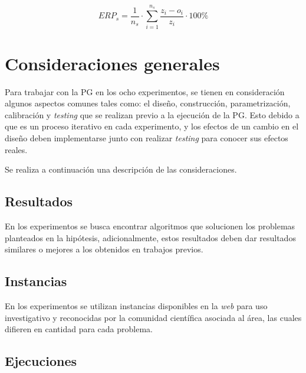 \begin{equation}
  \label{eq:ERP_cap3}
  ERP_{s} =  \frac{1}{n_{s}} \cdot \sum\limits_{i=1}^{n_{s}} \frac{z_{i} - o_{i}}{z_{i}} \cdot 100\%
\end{equation}


\section{Consideraciones generales}
\label{cap:consideraciones}

Para trabajar con la PG en los ocho experimentos, se tienen en consideración algunos aspectos comunes tales como: el diseño, construcción, parametrización, calibración y \textit{testing} que se realizan previo a la ejecución de la PG. Esto debido a que es un proceso iterativo en cada experimento, y los efectos de un cambio en el diseño deben implementarse junto con realizar \textit{testing} para conocer sus efectos reales. 

Se realiza a continuación una descripción de las consideraciones.

\subsection{Resultados}

En los experimentos se busca encontrar algoritmos que solucionen los problemas planteados en la hipótesis, adicionalmente, estos resultados deben dar resultados similares o mejores a los obtenidos en trabajos previos.

\subsection{Instancias}

En los experimentos se utilizan instancias disponibles en la \textit{web} para uso investigativo y reconocidas por la comunidad científica asociada al área, las cuales difieren en cantidad para cada problema.

\subsection{Ejecuciones}

